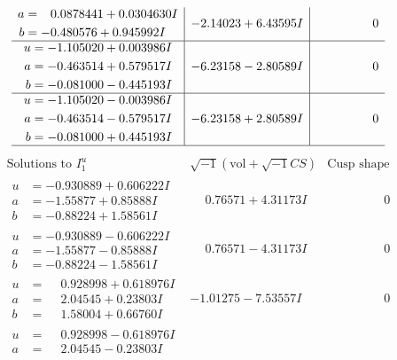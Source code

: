 \documentclass[1p]{elsarticle_modified}
\theoremstyle{definition}
\newcommand{\I}{\sqrt{-1}}
\begin{document}
$$\begin{array}{c|c|c}
\begin{aligned}
a &= \phantom{-}0.0878441 + 0.0304630 I \\
b &= -0.480576 + 0.945992 I\end{aligned}
 & -2.14023 + 6.43595 I & \phantom{-0.000000 } 0 \\ \hline\begin{aligned}
u &= -1.105020 + 0.003986 I \\
a &= -0.463514 + 0.579517 I \\
b &= -0.081000 - 0.445193 I\end{aligned}
 & -6.23158 - 2.80589 I & \phantom{-0.000000 } 0 \\ \hline\begin{aligned}
u &= -1.105020 - 0.003986 I \\
a &= -0.463514 - 0.579517 I \\
b &= -0.081000 + 0.445193 I\end{aligned}
 & -6.23158 + 2.80589 I & \phantom{-0.000000 } 0\\
 \hline 
 \end{array}$$\newpage$$\begin{array}{c|c|c}  
\text{Solutions to }I^u_{1}& \I (\text{vol} + \sqrt{-1}CS) & \text{Cusp shape}\\
 \hline 
\begin{aligned}
u &= -0.930889 + 0.606222 I \\
a &= -1.55877 + 0.85888 I \\
b &= -0.88224 + 1.58561 I\end{aligned}
 & \phantom{-}0.76571 + 4.31173 I & \phantom{-0.000000 } 0 \\ \hline\begin{aligned}
u &= -0.930889 - 0.606222 I \\
a &= -1.55877 - 0.85888 I \\
b &= -0.88224 - 1.58561 I\end{aligned}
 & \phantom{-}0.76571 - 4.31173 I & \phantom{-0.000000 } 0 \\ \hline\begin{aligned}
u &= \phantom{-}0.928998 + 0.618976 I \\
a &= \phantom{-}2.04545 + 0.23803 I \\
b &= \phantom{-}1.58004 + 0.66760 I\end{aligned}
 & -1.01275 - 7.53557 I & \phantom{-0.000000 } 0 \\ \hline\begin{aligned}
u &= \phantom{-}0.928998 - 0.618976 I \\
a &= \phantom{-}2.04545 - 0.23803 I \\

\end{aligned}
\end{array}$$
\end{document}
